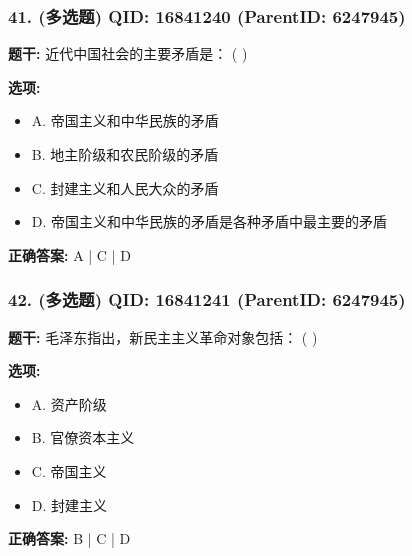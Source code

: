 \documentclass[12pt,UTF8]{ctexart}
\begin{document}
\subsubsection*{41. (多选题) \small QID: 16841240 (ParentID: 6247945)}

\textbf{题干:}
近代中国社会的主要矛盾是： ( )



\textbf{选项:}
\begin{itemize}[leftmargin=*]

  \item A. 帝国主义和中华民族的矛盾

  \item B. 地主阶级和农民阶级的矛盾

  \item C. 封建主义和人民大众的矛盾

  \item D. 帝国主义和中华民族的矛盾是各种矛盾中最主要的矛盾

\end{itemize}

\textbf{正确答案:}
A | C | D

\vspace{0.3em}\hrulefill\vspace{0.7em}

\subsubsection*{42. (多选题) \small QID: 16841241 (ParentID: 6247945)}

\textbf{题干:}
毛泽东指出，新民主主义革命对象包括： ( )



\textbf{选项:}
\begin{itemize}[leftmargin=*]

  \item A. 资产阶级

  \item B. 官僚资本主义

  \item C. 帝国主义

  \item D. 封建主义

\end{itemize}

\textbf{正确答案:}
B | C | D

\vspace{0.3em}\hrulefill\vspace{0.7em}
\end{document}

